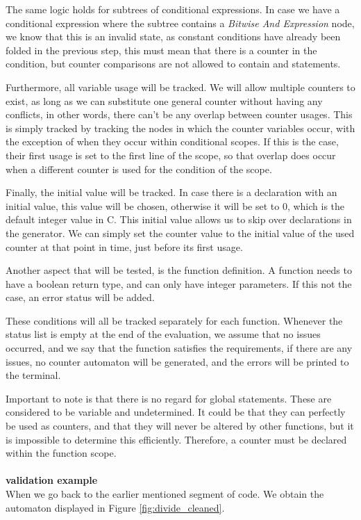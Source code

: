 \documentclass[12pt]{article}
\begin{document}
The same logic holds for subtrees of conditional expressions. In case we have a conditional expression where the subtree contains a \textit{Bitwise And Expression} node, we know that this is an invalid state, as constant conditions have already been folded in the previous step, this must mean that there is a counter in the condition, but counter comparisons are not allowed to contain and statements.

Furthermore, all variable usage will be tracked. We will allow multiple counters to exist, as long as we can substitute one general counter without having any conflicts, in other words, there can't be any overlap between counter usages. This is simply tracked by tracking the nodes in which the counter variables occur, with the exception of when they occur within conditional scopes. If this is the case, their first usage is set to the first line of the scope, so that overlap does occur when a different counter is used for the condition of the scope. 

Finally, the initial value will be tracked. In case there is a declaration with an initial value, this value will be chosen, otherwise it will be set to 0, which is the default integer value in C. This initial value allows us to skip over declarations in the generator. We can simply set the counter value to the initial value of the used counter at that point in time, just before its first usage.

Another aspect that will be tested, is the function definition. A function needs to have a boolean return type, and can only have integer parameters. If this not the case, an error status will be added.

These conditions will all be tracked separately for each function. Whenever the status list is empty at the end of the evaluation, we assume that no issues occurred, and we say that the function satisfies the requirements, if there are any issues, no counter automaton will be generated, and the errors will be printed to the terminal.

Important to note is that there is no regard for global statements. These are considered to be variable and undetermined. It could be that they can perfectly be used as counters, and that they will never be altered by other functions, but it is impossible to determine this efficiently. Therefore, a counter must be declared within the function scope.\\
\\
\noindent
\textbf{validation example}\\
When we go back to the earlier mentioned segment of code. We obtain the automaton displayed in Figure \ref{fig:divide_cleaned}.
\end{document}
